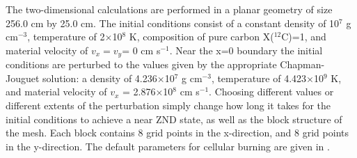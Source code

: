 The two-dimensional calculations are performed in a planar geometry of size 256.0 cm by 25.0 cm.
The
initial conditions consist of a constant density of 10$^7$ g
cm$^{-3}$, temperature of 2$\times$10$^{8}$ K, composition of pure
carbon X($^{12}$C)=1, and material velocity of $v_{x}=v_{y}$= 0 cm
s$^{-1}$.  Near the x=0 boundary the initial conditions are perturbed to the
values given by the appropriate Chapman-Jouguet solution: a density of
4.236$\times$10$^7$ g cm$^{-3}$, temperature of 4.423$\times$10$^9$ K,
and material velocity of $v_{x}$ = 2.876$\times$10$^8$ cm s$^{-1}$.
Choosing different values
or different extents of the perturbation simply change how long it
takes for the initial conditions to achieve a near ZND state, as well as
the block structure of the mesh.  Each block contains 8 grid points in the
x-direction, and 8 grid points in the y-direction. The default parameters for
cellular burning are given in .


